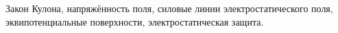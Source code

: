 \documentclass[__main__.tex]{subfiles}
\begin{document}
Закон Кулона, напряжённость поля, силовые линии электростатического поля, эквипотенциальные поверхности, электростатическая защита.\\ 

\end{document}
